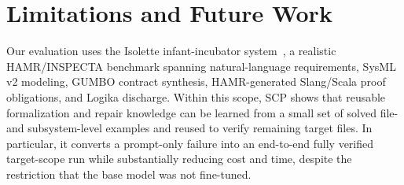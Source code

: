 \documentclass[conference]{IEEEtran}
\begin{document}

\section{Limitations and Future Work}
\label{sec:limitations}
Our evaluation uses the Isolette infant-incubator system~\cite{hatcliff2024isolette}, a realistic HAMR/INSPECTA benchmark spanning natural-language requirements, SysML v2 modeling, GUMBO contract synthesis, HAMR-generated Slang/Scala proof obligations, and Logika discharge. Within this scope, SCP shows that reusable formalization and repair knowledge can be learned from a small set of solved file- and subsystem-level examples and reused to verify remaining target files. In particular, it converts a prompt-only failure into an end-to-end fully verified target-scope run while substantially reducing cost and time, despite the restriction that the base model was not fine-tuned.
\end{document}
